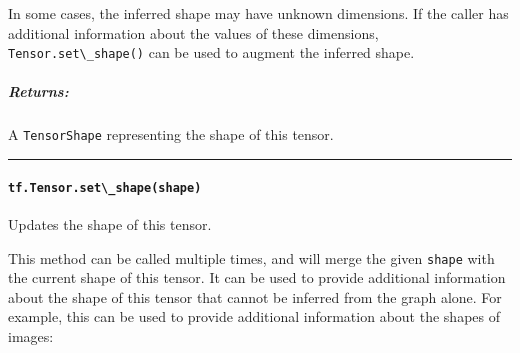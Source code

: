 In some cases, the inferred shape may have unknown dimensions. If the
caller has additional information about the values of these dimensions,
\lstinline{Tensor.set\_shape()} can be used to augment the inferred shape.

\subparagraph{Returns: }\label{returns-21}

A \lstinline{TensorShape} representing the shape of this tensor.

\begin{center}\rule{0.5\linewidth}{\linethickness}\end{center}

\paragraph{\texorpdfstring{\lstinline{tf.Tensor.set\_shape(shape)}
}{tf.Tensor.set\_shape(shape) }}\label{tf.tensor.setux5fshapeshape}

Updates the shape of this tensor.

This method can be called multiple times, and will merge the given
\lstinline{shape} with the current shape of this tensor. It can be used to
provide additional information about the shape of this tensor that
cannot be inferred from the graph alone. For example, this can be used
to provide additional information about the shapes of images:

\begin{Shaded}
\begin{Highlighting}[]
\OperatorTok{=} 
\OperatorTok{=} \OperatorTok{=}\NormalTok{)}

 
\OperatorTok{==>} \NormalTok{TensorShape([Dimension(}\NormalTok{)])}

\NormalTok{image.set_shape([}\NormalTok{, }\NormalTok{, }\NormalTok{])}
 
\OperatorTok{==>} \NormalTok{TensorShape([Dimension(}\NormalTok{)])}
\end{Highlighting}
\end{Shaded}

